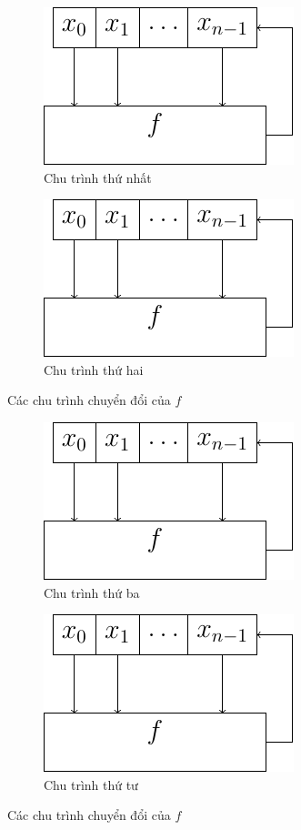\begin{example}
	\begin{figure}[ht]
		\begin{subfigure}{0.4\textwidth}
			\centering
			\includegraphics[page=2]{figures/boolean/lfsr.pdf}
			\caption{Chu trình thứ nhất}
		\end{subfigure}
		\hfill
		\begin{subfigure}{0.4\textwidth}
			\centering
			\includegraphics[page=3]{figures/boolean/lfsr.pdf}
			\caption{Chu trình thứ hai}
		\end{subfigure}
		\caption{Các chu trình chuyển đổi của $f$}
		\label{lfsr:im2}
	\end{figure}
	\begin{figure}[ht]
		\begin{subfigure}{0.3\textwidth}
			\centering
			\includegraphics[page=5]{figures/boolean/lfsr.pdf}
			\caption{Chu trình thứ ba}
		\end{subfigure}
		\hfill
		\begin{subfigure}{0.65\textwidth}
			\centering
			\includegraphics[page=4]{figures/boolean/lfsr.pdf}
			\caption{Chu trình thứ tư}
		\end{subfigure}
		\caption{Các chu trình chuyển đổi của $f$}
		\label{lfsr:im3}
	\end{figure}
	
\end{example}
